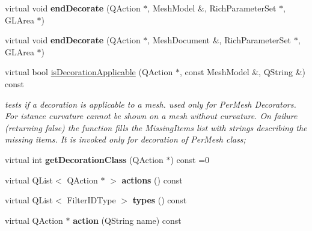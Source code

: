 \begin{DoxyCompactItemize}
\item 
\mbox{\label{class_mesh_decorate_interface_a732109fdfde6a3bd096d072a422a200e}} 
virtual void {\bfseries end\+Decorate} (Q\+Action $\ast$, Mesh\+Model \&, Rich\+Parameter\+Set $\ast$, G\+L\+Area $\ast$)
\item 
\mbox{\label{class_mesh_decorate_interface_a96e99086b56af0ac430d66c91156ddb4}} 
virtual void {\bfseries end\+Decorate} (Q\+Action $\ast$, Mesh\+Document \&, Rich\+Parameter\+Set $\ast$, G\+L\+Area $\ast$)
\item 
\mbox{\label{class_mesh_decorate_interface_ae102f11860a50d871e6a729de2dade72}} 
virtual bool \hyperlink{class_mesh_decorate_interface_ae102f11860a50d871e6a729de2dade72}{is\+Decoration\+Applicable} (Q\+Action $\ast$, const Mesh\+Model \&, Q\+String \&) const
\begin{DoxyCompactList}\small\item\em tests if a decoration is applicable to a mesh. used only for Per\+Mesh Decorators. For istance curvature cannot be shown on a mesh without curvature. On failure (returning false) the function fills the Missing\+Items list with strings describing the missing items. It is invoked only for decoration of  Per\+Mesh class; \end{DoxyCompactList}\item 
\mbox{\label{class_mesh_decorate_interface_a9b449757d837814f2a9cb967611f6a7d}} 
virtual int {\bfseries get\+Decoration\+Class} (Q\+Action $\ast$) const =0
\item 
\mbox{\label{class_mesh_decorate_interface_abeb44596dcee0e57af196de7bfb48d80}} 
virtual Q\+List$<$ Q\+Action $\ast$ $>$ {\bfseries actions} () const
\item 
\mbox{\label{class_mesh_decorate_interface_a39516bae6ed6c42d8e64c6960004d6d5}} 
virtual Q\+List$<$ Filter\+I\+D\+Type $>$ {\bfseries types} () const
\item 
\mbox{\label{class_mesh_decorate_interface_ae95ba838101198a627444c9ae7b2a5ed}} 
virtual Q\+Action $\ast$ {\bfseries action} (Q\+String name) const
\end{DoxyCompactItemize}
